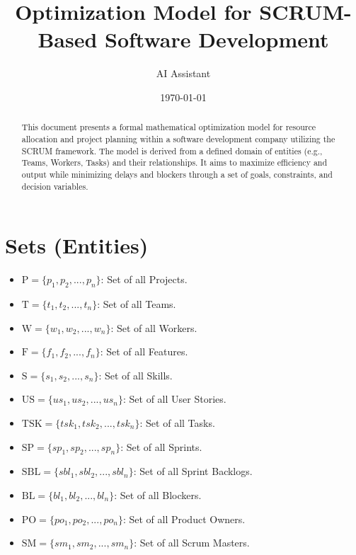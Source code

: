 \documentclass[11pt]{article}
\title{Optimization Model for SCRUM-Based Software Development}
\author{AI Assistant}
\date{\today}
\begin{document}
\begin{titlingpage}
    \maketitle
    \begin{abstract}
        This document presents a formal mathematical optimization model for resource allocation and project planning within a software development company utilizing the SCRUM framework. The model is derived from a defined domain of entities (e.g., Teams, Workers, Tasks) and their relationships. It aims to maximize efficiency and output while minimizing delays and blockers through a set of goals, constraints, and decision variables.
    \end{abstract}
    \tableofcontents
\end{titlingpage}

\section{Sets (Entities)}
\begin{itemize}[label=--]
    \item $\text{P} = \{p_1, p_2, ..., p_n\}$: Set of all Projects.
    \item $\text{T} = \{t_1, t_2, ..., t_n\}$: Set of all Teams.
    \item $\text{W} = \{w_1, w_2, ..., w_n\}$: Set of all Workers.
    \item $\text{F} = \{f_1, f_2, ..., f_n\}$: Set of all Features.
    \item $\text{S} = \{s_1, s_2, ..., s_n\}$: Set of all Skills.
    \item $\text{US} = \{us_1, us_2, ..., us_n\}$: Set of all User Stories.
    \item $\text{TSK} = \{tsk_1, tsk_2, ..., tsk_n\}$: Set of all Tasks.
    \item $\text{SP} = \{sp_1, sp_2, ..., sp_n\}$: Set of all Sprints.
    \item $\text{SBL} = \{sbl_1, sbl_2, ..., sbl_n\}$: Set of all Sprint Backlogs.
    \item $\text{BL} = \{bl_1, bl_2, ..., bl_n\}$: Set of all Blockers.
    \item $\text{PO} = \{po_1, po_2, ..., po_n\}$: Set of all Product Owners.
    \item $\text{SM} = \{sm_1, sm_2, ..., sm_n\}$: Set of all Scrum Masters.
\end{itemize}
\end{document}
